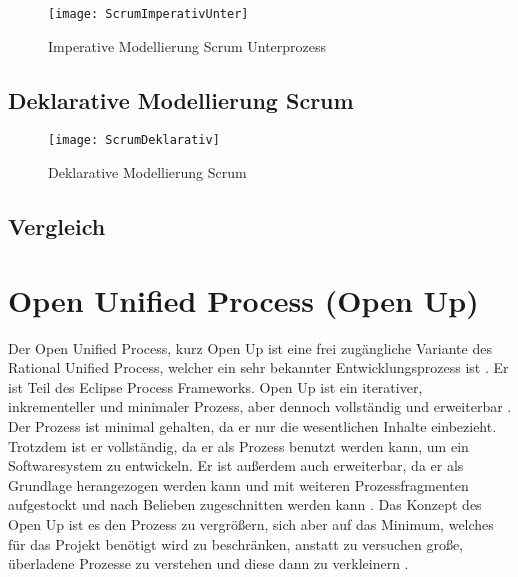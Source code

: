 \begin{figure}[htp]
\begin{center}
  \texttt{[image: ScrumImperativUnter]} %
  \caption{Imperative Modellierung Scrum Unterprozess}
  \label{fig:ScrumImperativUnter}
\end{center}
\end{figure}

\subsection{Deklarative Modellierung Scrum}

\begin{figure}[htp]
\begin{center}
  \texttt{[image: ScrumDeklarativ]} %
  \caption{Deklarative Modellierung Scrum}
  \label{fig:ScrumDeklarativ}
\end{center}
\end{figure}

\subsection{Vergleich}



\section{Open Unified Process (Open Up)}


Der Open Unified Process, kurz Open Up ist eine frei zugängliche Variante des Rational Unified Process, welcher ein sehr bekannter Entwicklungsprozess ist \cite{hauber2010}.  Er ist Teil des Eclipse Process Frameworks. Open Up ist ein iterativer, inkrementeller und minimaler Prozess, aber dennoch vollständig und erweiterbar \cite{Gau2006, Basem2010}. Der Prozess ist minimal gehalten, da er nur die wesentlichen Inhalte einbezieht. Trotzdem ist er vollständig, da er als Prozess benutzt werden kann, um ein Softwaresystem zu entwickeln. Er ist außerdem auch erweiterbar, da er als Grundlage herangezogen werden kann und mit weiteren Prozessfragmenten aufgestockt und nach Belieben zugeschnitten werden kann \cite{Wang2007}. Das Konzept des Open Up ist es den Prozess zu vergrößern, sich aber auf das Minimum, welches für das Projekt benötigt wird zu beschränken, anstatt zu versuchen große, überladene Prozesse zu verstehen und diese dann zu verkleinern \cite{ambler2012}.  \newline



